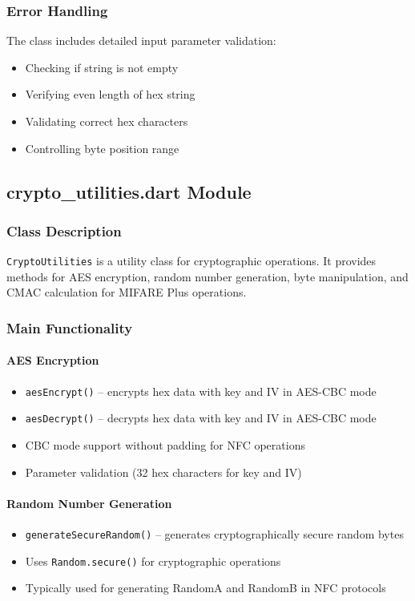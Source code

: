 \documentclass[a4paper,12pt]{article}
\begin{document}
\subsubsection{Error Handling}
The class includes detailed input parameter validation:
\begin{itemize}
    \item Checking if string is not empty
    \item Verifying even length of hex string
    \item Validating correct hex characters
    \item Controlling byte position range
\end{itemize}

\subsection{crypto\_utilities.dart Module}

\subsubsection{Class Description}
\texttt{CryptoUtilities} is a utility class for cryptographic operations. It provides methods for AES encryption, random number generation, byte manipulation, and CMAC calculation for MIFARE Plus operations.

\subsubsection{Main Functionality}

\paragraph{AES Encryption}
\begin{itemize}
    \item \texttt{aesEncrypt()} -- encrypts hex data with key and IV in AES-CBC mode
    \item \texttt{aesDecrypt()} -- decrypts hex data with key and IV in AES-CBC mode
    \item CBC mode support without padding for NFC operations
    \item Parameter validation (32 hex characters for key and IV)
\end{itemize}

\paragraph{Random Number Generation}
\begin{itemize}
    \item \texttt{generateSecureRandom()} -- generates cryptographically secure random bytes
    \item Uses \texttt{Random.secure()} for cryptographic operations
    \item Typically used for generating RandomA and RandomB in NFC protocols
\end{itemize}
\end{document}

